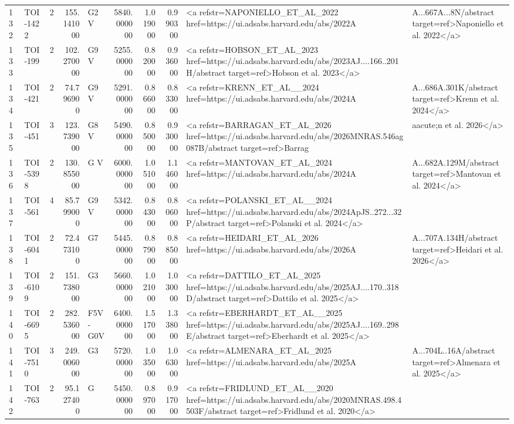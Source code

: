 \begin{tabular}{llrrlrrrl}
132 & TOI-1422 & 2 & 155.141000 & G2 V & 5840.000000 & 1.019000 & 0.990300 & <a refstr=NAPONIELLO_ET_AL_2022 href=https://ui.adsabs.harvard.edu/abs/2022A&A...667A...8N/abstract target=ref>Naponiello et al. 2022</a> \\
133 & TOI-199 & 2 & 102.270000 & G9 V & 5255.000000 & 0.820000 & 0.936000 & <a refstr=HOBSON_ET_AL_2023 href=https://ui.adsabs.harvard.edu/abs/2023AJ....166..201H/abstract target=ref>Hobson et al. 2023</a> \\
134 & TOI-421 & 2 & 74.796900 & G9 V & 5291.000000 & 0.866000 & 0.833000 & <a refstr=KRENN_ET_AL__2024 href=https://ui.adsabs.harvard.edu/abs/2024A&A...686A.301K/abstract target=ref>Krenn et al. 2024</a> \\
135 & TOI-451 & 3 & 123.739000 & G8 V & 5490.000000 & 0.850000 & 0.930000 & <a refstr=BARRAGAN_ET_AL_2026 href=https://ui.adsabs.harvard.edu/abs/2026MNRAS.546ag087B/abstract target=ref>Barrag&aacute;n et al. 2026</a> \\
136 & TOI-5398 & 2 & 130.855000 & G V & 6000.000000 & 1.051000 & 1.146000 & <a refstr=MANTOVAN_ET_AL_2024 href=https://ui.adsabs.harvard.edu/abs/2024A&A...682A.129M/abstract target=ref>Mantovan et al. 2024</a> \\
137 & TOI-561 & 4 & 85.799000 & G9 V & 5342.000000 & 0.843000 & 0.806000 & <a refstr=POLANSKI_ET_AL__2024 href=https://ui.adsabs.harvard.edu/abs/2024ApJS..272...32P/abstract target=ref>Polanski et al. 2024</a> \\
138 & TOI-6041 & 2 & 72.473100 & G7 & 5445.000000 & 0.879000 & 0.885000 & <a refstr=HEIDARI_ET_AL_2026 href=https://ui.adsabs.harvard.edu/abs/2026A&A...707A.134H/abstract target=ref>Heidari et al. 2026</a> \\
139 & TOI-6109 & 2 & 151.738000 & G3 & 5660.000000 & 1.021000 & 1.030000 & <a refstr=DATTILO_ET_AL_2025 href=https://ui.adsabs.harvard.edu/abs/2025AJ....170..318D/abstract target=ref>Dattilo et al. 2025</a> \\
140 & TOI-6695 & 2 & 282.536000 & F5V-G0V & 6400.000000 & 1.517000 & 1.338000 & <a refstr=EBERHARDT_ET_AL__2025 href=https://ui.adsabs.harvard.edu/abs/2025AJ....169..298E/abstract target=ref>Eberhardt et al. 2025</a> \\
141 & TOI-7510 & 3 & 249.006000 & G3 & 5720.000000 & 1.035000 & 1.063000 & <a refstr=ALMENARA_ET_AL_2025 href=https://ui.adsabs.harvard.edu/abs/2025A&A...704L..16A/abstract target=ref>Almenara et al. 2025</a> \\
142 & TOI-763 & 2 & 95.127400 & G & 5450.000000 & 0.897000 & 0.917000 & <a refstr=FRIDLUND_ET_AL__2020 href=https://ui.adsabs.harvard.edu/abs/2020MNRAS.498.4503F/abstract target=ref>Fridlund et al. 2020</a> \\

\end{tabular}
